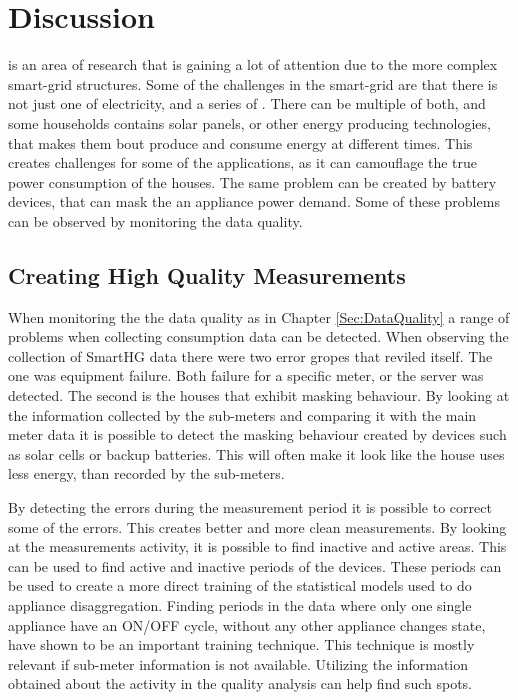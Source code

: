 \chapter{Discussion}

 is an area of research that is gaining a lot of attention due to the more complex smart-grid structures. Some of the challenges in the smart-grid are that there is not just one  of electricity, and a series of . There can be multiple of both, and some households contains solar panels, or other energy producing technologies, that makes them bout produce and consume energy at different times. This creates challenges for some of the  applications, as it can camouflage the true power consumption of the houses. The same problem can be created by battery devices, that can mask the an appliance power demand. Some of these problems can be observed by monitoring the data quality.

\section{Creating High Quality Measurements}
When monitoring the the data quality as in Chapter \ref{Sec:DataQuality} a range of problems when collecting consumption data can be detected. When observing the collection of SmartHG data there were two error gropes that reviled itself. The one was equipment failure. Both failure for a specific meter, or the server was detected. The second is the houses that exhibit masking behaviour. By looking at the information collected by the sub-meters and comparing it with the main meter data it is possible to detect the masking behaviour created by devices such as solar cells or backup batteries. This will often make it look like the house uses less energy, than recorded by the sub-meters. 

By detecting the errors during the measurement period it is possible to correct some of the errors. This creates better and more clean measurements. By looking at the measurements activity, it is possible to find inactive and active areas. This can be used to find active and inactive periods of the devices. These periods can be used to create a more direct training of the statistical models used to do appliance disaggregation. Finding periods in the data where only one single appliance have an ON/OFF cycle, without any other appliance changes state, have shown to be an important training technique. This technique is mostly relevant if sub-meter information is not available. Utilizing the information obtained about the activity in the quality analysis can help find such spots.

